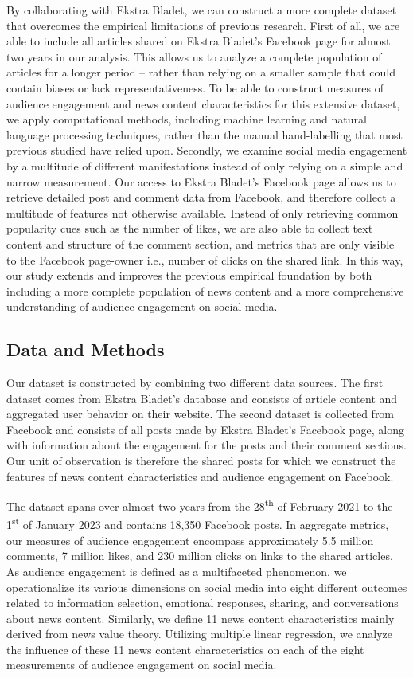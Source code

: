 \documentclass[
]{article}
\begin{document}
By collaborating with Ekstra Bladet, we can construct a more complete
dataset that overcomes the empirical limitations of previous research.
First of all, we are able to include all articles shared on Ekstra
Bladet's Facebook page for almost two years in our analysis. This allows
us to analyze a complete population of articles for a longer period --
rather than relying on a smaller sample that could contain biases or
lack representativeness. To be able to construct measures of audience
engagement and news content characteristics for this extensive dataset,
we apply computational methods, including machine learning and natural
language processing techniques, rather than the manual hand-labelling
that most previous studied have relied upon. Secondly, we examine social
media engagement by a multitude of different manifestations instead of
only relying on a simple and narrow measurement. Our access to Ekstra
Bladet's Facebook page allows us to retrieve detailed post and comment
data from Facebook, and therefore collect a multitude of features not
otherwise available. Instead of only retrieving common popularity cues
such as the number of likes, we are also able to collect text content
and structure of the comment section, and metrics that are only visible
to the Facebook page-owner i.e., number of clicks on the shared link. In
this way, our study extends and improves the previous empirical
foundation by both including a more complete population of news content
and a more comprehensive understanding of audience engagement on social
media.

\hypertarget{data-and-methods}{%
\subsection{Data and Methods}\label{data-and-methods}}

Our dataset is constructed by combining two different data sources. The
first dataset comes from Ekstra Bladet's database and consists of
article content and aggregated user behavior on their website. The
second dataset is collected from Facebook and consists of all posts made
by Ekstra Bladet's Facebook page, along with information about the
engagement for the posts and their comment sections. Our unit of
observation is therefore the shared posts for which we construct the
features of news content characteristics and audience engagement on
Facebook.

The dataset spans over almost two years from the 28\textsuperscript{th}
of February 2021 to the 1\textsuperscript{st} of January 2023 and
contains 18,350 Facebook posts. In aggregate metrics, our measures of
audience engagement encompass approximately 5.5 million comments, 7
million likes, and 230 million clicks on links to the shared articles.
As audience engagement is defined as a multifaceted phenomenon, we
operationalize its various dimensions on social media into eight
different outcomes related to information selection, emotional
responses, sharing, and conversations about news content. Similarly, we
define 11 news content characteristics mainly derived from news value
theory. Utilizing multiple linear regression, we analyze the influence
of these 11 news content characteristics on each of the eight
measurements of audience engagement on social media.
\end{document}
